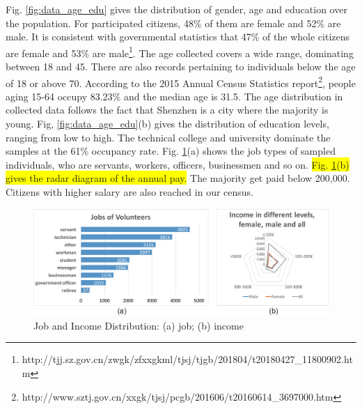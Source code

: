 \documentclass{ieeeaccess}
\begin{document}
Fig. \ref{fig:data_age_edu} gives the distribution of gender, age and education over the population. For participated citizens, 48\% of them are female and 52\% are male. It is consistent with governmental statistics that 47\% of the whole citizens are female and 53\% are male\footnote{http://tjj.sz.gov.cn/zwgk/zfxxgkml/tjsj/tjgb/201804/t20180427\_11800902.htm}. The age collected covers a wide range, dominating between 18 and 45. There are also records pertaining to individuals below the age of 18 or above 70. According to the 2015 Annual Census Statistics report\footnote{http://www.sztj.gov.cn/xxgk/tjsj/pcgb/201606/t20160614\_3697000.htm}, people aging 15-64 occupy 83.23\% and the median age is 31.5. The age distribution in collected data follows the fact that Shenzhen is a city where the majority is young. Fig, \ref{fig:data_age_edu}(b) gives the distribution of education levels, ranging from low to high. The technical college and university dominate the samples at the 61\% occupancy rate. Fig. \ref{fig:data_job_inc}(a) shows the job types of sampled individuals, who are servants, workers, officers, businessmen and so on. \colorbox{yellow}{Fig. \ref{fig:data_job_inc}(b) gives the radar diagram of the annual pay.} The majority get paid below 200,000. Citizens with higher salary are also reached in our census. 

\begin{figure}[htb!]
 \centering %
 \includegraphics[width=\columnwidth]{pictures/data2}
 \caption{Job and Income Distribution: (a) job; (b) income}
 \label{fig:data_job_inc}
\end{figure}
\end{document}
